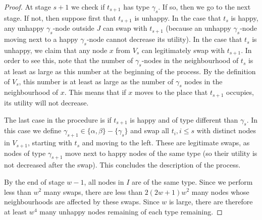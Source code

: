 \documentclass[11pt]{article}
\theoremstyle{plain}
\numberwithin{equation}{subsection}
\begin{document}
\begin{proof}
At stage $s+1$ we check if $t_{s+1}$ has type $\gamma_s$. If so, then we go to the next
stage. If not, then suppose first that $t_{s+1}$ is unhappy. In the case that $t_s$ is happy,
any unhappy $\gamma_s$-node outside $J$  can swap with
$t_{s+1}$ (because an unhappy $\gamma_s$-node moving next to a happy
$\gamma_s$-node cannot decrease its utility). 
In the case that $t_s$ is unhappy, we claim that any node $x$ from
$V_s$ can legitimately swap with $t_{s+1}$. In order to see this,
note that the number of $\gamma_s$-nodes in the neighbourhood of
$t_s$ is at least as large as this number at the beginning of the process.
By the definition of $V_s$, this number is at least as large as the number
of $\gamma_s$ nodes in the neighbourhood of $x$. This means that
if $x$ moves to the place that $t_{s+1}$ occupies, its utility will not decrease.

The last case in the procedure is if $t_{s+1}$ is happy and of type different than
$\gamma_s$. In this case we define $\gamma_{s+1}\in \{\alpha,\beta\}-\{\gamma_s\}$
and swap all $t_i, i\leq s$ with distinct nodes in $V_{s+1}$, starting with $t_s$ and moving
to the left. These are legitimate swaps, as nodes of type $\gamma_{s+1}$
move next to happy nodes of the same type (so their utility is not decreased after the swap).
This concludes the description of the process.

By the end of stage $w-1$, all nodes in $I$ are of the same type. Since we perform less than $w^2$ many swaps, there are less than $2(2w+1)w^2$ many nodes whose neighbourhoods are affected by these swaps. Since $w$ is large, there are therefore at least $w^4$ many unhappy nodes remaining of each type remaining. 
\end{proof}
\end{document}
